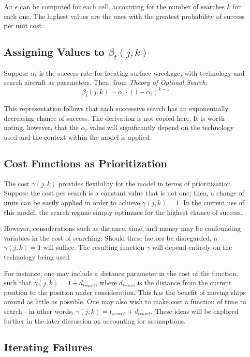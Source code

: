 \documentclass[a4paper]{article}
\begin{document}
An $\epsilon$ can be computed for each cell, accounting for the number of searches $k$ for each one. The highest values are the ones with the greatest probability of success per unit cost. 

\subsection{Assigning Values to $\beta_t(j,k)$}

Suppose $\alpha_t$ is the success rate for locating surface wreckage, with technology and search aircraft as parameters. Then, from \textit{Theory of Optimal Search}: \[\beta_t(j,k)=\alpha_t\cdot(1-\alpha_t)^{k-1}\]

This representation follows that each successive search has an exponentially decreasing chance of success. The derivation is not copied here. It is worth noting, however, that the $\alpha_t$ value will significantly depend on the technology used and the context within the model is applied.

\subsection{Cost Functions as Prioritization}

The cost $\gamma(j,k)$ provides flexibility for the model in terms of prioritization. Suppose the cost per search is a constant value that is not one; then, a change of units can be easily applied in order to achieve $\gamma(j,k)=1$. In the current use of this model, the search regime simply optimizes for the highest chance of success. 

However, considerations such as distance, time, and money may be confounding variables in the cost of searching. Should these factors be disregarded, a $\gamma(j,k)=1$ will suffice. The resulting function $\gamma$ will depend entirely on the technology being used. 

For instance, one may include a distance parameter in the cost of the function, such that $\gamma(j,k)=1+d_{travel}$, where $d_{travel}$ is the distance from the current position to the position under consideration. This has the benefit of moving ships around as little as possible. One may also wish to make cost a function of time to search - in other words, $\gamma(j,k)=t_{search}+d_{travel}$. These ideas will be explored further in the later discussion on accounting for assumptions. 

\subsection{Iterating Failures}
\end{document}
